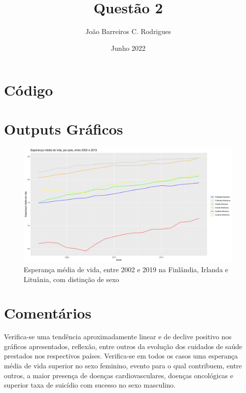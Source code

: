 \documentclass[a4paper,8pt]{extarticle}
\title{\vspace{-2.5cm} \large {\bfseries{Questão 2}}}
\author{João Barreiros C. Rodrigues}
\date{Junho 2022}
\begin{document}
	\maketitle
	\vspace{-1cm}
	\section{Código}
		
	\section{Outputs Gráficos}
		\begin{figure}[H]
                                \centering
                                \captionsetup{justification=centering}
                                \includegraphics[scale=0.3\textscale]{module2.png}
                                \caption{Esperança média de vida, entre 2002 e 2019 na Finlândia, Irlanda e Lituânia, com distinção de sexo}
        	\end{figure}
	\section{Comentários}
		Verifica-se uma tendência aproximadamente linear e de declive positivo nos gráficos apresentados, reflexão, entre outros da evolução dos cuidados de saúde prestados nos respectivos países.
		\newline
		Verifica-se em todos os casos uma esperança média de vida superior no sexo feminino, evento para o qual contribuem, entre outros, a maior presença de doenças cardiovasculares, doenças oncológicas e superior taxa de suicídio com sucesso no sexo masculino.
		
\end{document}

